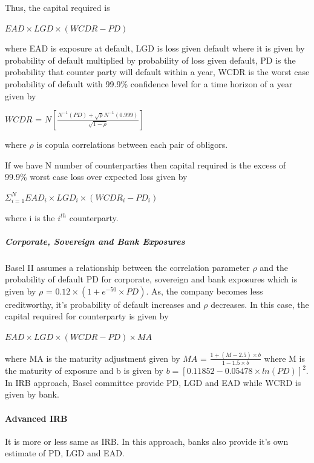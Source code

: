\documentclass[11pt]{article}
\numberwithin{equation}{section}
\begin{document}
Thus, the capital required is
\begin{center}
  $EAD \times LGD \times(WCDR-PD)$
\end{center}
where EAD is exposure at default, LGD is loss given default where it is given by probability of default multiplied by probability of loss given default, PD is the probability that counter party will default within a year, WCDR is the worst case probability of default with 99.9\% confidence level for a time horizon of a year given by 
\begin{center}
	$ WCDR $ = $N\left[\frac{N^{-1}(PD) + \sqrt{\rho}N^{-1}(0.999)}{\sqrt{1-\rho}} \right]$
\end{center} 
where $\rho$ is copula correlations between each pair of obligors.  
 
\hspace{1cm} If we have N number of counterparties then capital required is the excess of 99.9\% worst case loss over expected loss given by 
\begin{center}
 $\Sigma_{i=1}^{N} EAD_i \times LGD_i \times (WCDR_i-PD_i)$
\end{center}
where i is the $i^{th}$ counterparty.

\subparagraph{Corporate, Sovereign and Bank Exposures}\mbox{} \medskip

\hspace{1cm}Basel II assumes a relationship between the correlation parameter $\rho$ and the probability
of default PD for corporate, sovereign and bank exposures which is given by $\rho$ = $0.12\times(1+e^{-50}\times PD)$. As, the company becomes less creditworthy, it's probability of default increases and $\rho$ decreases. In this case, the capital required for counterparty is given by 
\begin{center}
$EAD \times LGD \times (WCDR-PD) \times MA$
\end{center}
where MA is the maturity adjustment given by $MA$ = $\frac{1+(M-2.5) \times b}{1-1.5 \times b}$ where M is the maturity of exposure and b is given by $b=[{0.11852-0.05478 \times ln(PD)}]^{2}$. In IRB approach, Basel committee provide PD, LGD and EAD while WCRD is given by bank. 

\paragraph{Advanced IRB}\mbox{}
\medskip

\hspace{1cm}It is more or less same as IRB. In this approach, banks also provide it's own estimate of PD, LGD and EAD.
\end{document}
